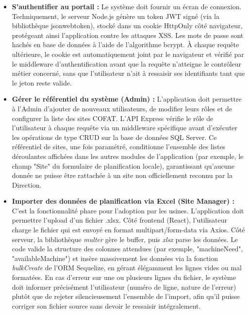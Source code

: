 \begin{itemize}
    \item \textbf{S'authentifier au portail :} Le système doit fournir un écran de connexion. Techniquement, le serveur Node.js génère un token JWT signé (via la bibliothèque jsonwebtoken), stocké dans un cookie HttpOnly côté navigateur, protégeant ainsi l'application contre les attaques XSS. Les mots de passe sont hachés en base de données à l'aide de l'algorithme bcrypt. À chaque requête ultérieure, le cookie est automatiquement joint par le navigateur et vérifié par le middleware d'authentification avant que la requête n'atteigne le contrôleur métier concerné, sans que l'utilisateur n'ait à ressaisir ses identifiants tant que le jeton reste valide.
    
    \item \textbf{Gérer le référentiel du système (Admin) :} L'application doit permettre à l'Admin d'ajouter de nouveaux utilisateurs, de modifier leurs rôles et de configurer la liste des sites COFAT. L'API Express vérifie le rôle de l'utilisateur à chaque requête via un middleware spécifique avant d'exécuter les opérations de type CRUD sur la base de données SQL Server. Ce référentiel de sites, une fois paramétré, conditionne l'ensemble des listes déroulantes affichées dans les autres modules de l'application (par exemple, le champ "Site" du formulaire de planification locale), garantissant qu'aucune donnée ne puisse être rattachée à un site non officiellement reconnu par la Direction.
    
    \item \textbf{Importer des données de planification via Excel (Site Manager) :} C'est la fonctionnalité phare pour l'adoption par les usines. L'application doit permettre l'upload d'un fichier .xlsx. Côté frontend (React), l'utilisateur charge le fichier qui est envoyé en format multipart/form-data via Axios. Côté serveur, la bibliothèque \textit{multer} gère le buffer, puis \textit{xlsx} parse les données. Le code valide la structure des colonnes attendues (par exemple, "machineNeed", "availableMachine") et insère massivement les données via la fonction \textit{bulkCreate} de l'ORM Sequelize, en gérant élégamment les lignes vides ou mal formatées. En cas d'erreur sur une ou plusieurs lignes du fichier, le système doit informer précisément l'utilisateur (numéro de ligne, nature de l'erreur) plutôt que de rejeter silencieusement l'ensemble de l'import, afin qu'il puisse corriger son fichier source sans devoir le ressaisir intégralement.
    

\end{itemize}
